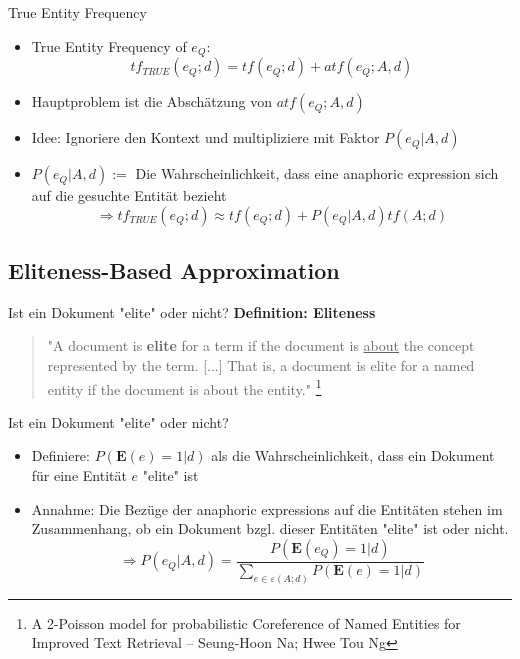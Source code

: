 \documentclass{beamer}
\begin{document}
\begin{frame}{True Entity Frequency}
\begin{itemize}
\item True Entity Frequency of $e_Q$:
	\[tf_{TRUE}(e_Q;d) = tf(e_Q;d) + atf(e_Q;A,d)\]
\item Hauptproblem ist die Abschätzung von $atf(e_Q;A,d)$
\item Idee: Ignoriere den Kontext und multipliziere mit Faktor $P(e_Q|A,d)$
\item $P(e_Q|A,d):=$ Die Wahrscheinlichkeit, dass eine anaphoric expression sich auf die gesuchte Entität bezieht
\[ \Rightarrow tf_{TRUE}(e_Q;d) \approx tf(e_Q;d) + P(e_Q|A,d)tf(A;d)\]
\end{itemize}
\end{frame}


\subsection{Eliteness-Based Approximation}

\begin{frame}{Ist ein Dokument "elite" oder nicht?}
	\textbf{Definition: Eliteness}\cite{paper:NaNg} \\
\begin{quote}
"A document is \textbf{elite} for a term if the document is \underline{about} the concept represented by the term. [...] 
That is, a document is elite for a named entity if the document is about the entity." \footnote{A 2-Poisson model for probabilistic Coreference of Named Entities for Improved Text Retrieval -- Seung-Hoon Na; Hwee Tou Ng}
\end{quote}
\end{frame}

\begin{frame}{Ist ein Dokument "elite" oder nicht?}
\begin{itemize}
\item Definiere: $P(\textbf{E}(e)=1|d)$ als die Wahrscheinlichkeit, dass ein Dokument für eine Entität $e$ "elite" ist
\item Annahme: Die Bezüge der anaphoric expressions auf die Entitäten stehen im Zusammenhang, ob ein Dokument bzgl. dieser Entitäten "elite" ist oder nicht.
\[ \Rightarrow P(e_Q|A,d) = \frac{P(\textbf{E}(e_Q)=1|d)}{\sum_{e \in \varepsilon (A;d)}P(\textbf{E}(e)=1|d)} \]
\end{itemize}
\end{frame}
\end{document}

